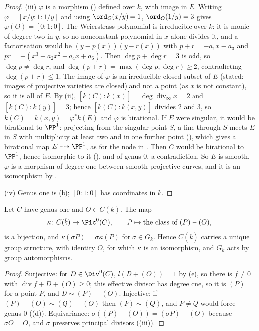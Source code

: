 \begin{proof}
(iii) $\varphi$ is a morphism () defined over $k$, with image in $E$. Writing $\varphi=[x/y:1:1/y]$ and using $\ord_O(x/y)=1$,
$\ord_O(1/y)=3$ gives $\varphi(O)=[0:1:0]$. The Weierstrass polynomial is irreducible over $\bar k$: it is monic of degree two in $y$, so no nonconstant polynomial in $x$ alone divides it, and a
factorisation would be $(y-p(x))(y-r(x))$ with $p+r=-a_1x-a_3$ and $pr=-(x^3+a_2x^2+a_4x+a_6)$. Then $\deg p+\deg r=3$ is odd, so $\deg p\ne\deg r$, and
$\deg(p+r)=\max(\deg p,\deg r)\ge2$, contradicting $\deg(p+r)\le1$. The image of $\varphi$ is an irreducible closed
subset of $E$ (stated: images of projective varieties are closed) and not a point (as $x$ is not constant), so it is all of $E$. By
(ii), $[\bar k(C):\bar k(x)]=\deg\operatorname{div}_\infty x=2$ and $[\bar k(C):\bar k(y)]=3$; hence $[\bar k(C):\bar k(x,y)]$ divides $2$ and $3$, so
$\bar k(C)=\bar k(x,y)=\varphi^*\bar k(E)$ and $\varphi$ is birational. If $E$ were singular, it would be birational to $\PP^1$: projecting from the singular point $S$,
a line through $S$ meets $E$ in $S$ with multiplicity at least two and in one further point (), which gives a birational map
$E\dashrightarrow\PP^1$, as for the node in . Then $C$ would be birational to $\PP^1$, hence isomorphic to it
(), and of genus $0$, a contradiction. So $E$ is smooth, $\varphi$ is a morphism of degree one between smooth projective curves,
and it is an isomorphism by .

(iv) Genus one is (b); $[0:1:0]$ has coordinates in $k$.
\end{proof}

\begin{proposition}\label{prop:curves:genus-one-pic}
Let $C$ have genus one and $O\in C(k)$. The map
\[
\kappa\colon C(\bar k)\to\Pic^0(C),\qquad P\mapsto\text{the class of }(P)-(O),
\]
is a bijection, and $\kappa(\sigma P)=\sigma\kappa(P)$ for $\sigma\in G_k$. Hence $C(\bar k)$ carries a unique group structure, with identity $O$, for which $\kappa$ is an
isomorphism, and $G_k$ acts by group automorphisms.
\end{proposition}

\begin{proof}
Surjective: for $D\in\Div^0(C)$, $l(D+(O))=1$ by (e), so there is $f\ne0$ with $\operatorname{div}f+D+(O)\ge0$; this
effective divisor has degree one, so it is $(P)$ for a point $P$, and $D\sim(P)-(O)$. Injective: if $(P)-(O)\sim(Q)-(O)$ then $(P)\sim(Q)$, and $P\ne Q$ would
force genus $0$ ((d)). Equivariance: $\sigma((P)-(O))=(\sigma P)-(O)$ because $\sigma O=O$, and $\sigma$ preserves principal divisors
((iii)).
\end{proof}

